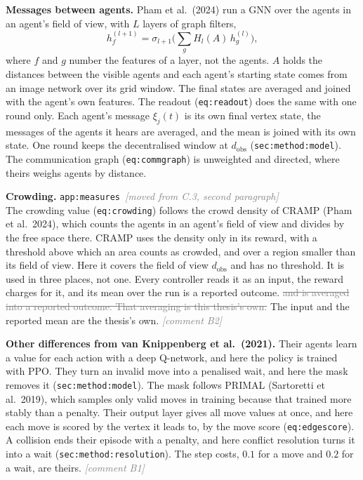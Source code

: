 \documentclass[11pt,a4paper]{article}
\newcommand{\new}[1]{\textcolor{newc}{#1}}
\newcommand{\old}[1]{\textcolor{gray}{\sout{#1}}}
\newcommand{\lref}[1]{{\small\texttt{#1}}}
\newcommand{\moved}[1]{{\small\textcolor{gray}{\emph{[moved from #1]}}}}
\newcommand{\cmt}[1]{{\small\textcolor{gray}{\emph{[comment #1]}}}}
\begin{document}
\textbf{Messages between agents.} Pham et al.\ (2024) run a GNN over the
agents in an agent's field of view, with $L$ layers of graph filters,
\begin{equation*}
  h^{(l+1)}_f = \sigma_{l+1}\bigl( \textstyle\sum_{g} H_l(A)\, h^{(l)}_g \bigr),
\end{equation*}
where $f$ and $g$ number the features of a layer, not the agents. $A$ holds
the distances between the visible agents and each agent's starting state
comes from an image network over its grid window. The final states are
averaged and joined with the agent's own features. The readout
(\lref{eq:readout}) does the same with one round only. Each agent's message
$\xi_j(t)$ is its own final vertex state, the messages of the agents it hears
are averaged, and the mean is joined with its own state. One round keeps the
decentralised window at $d_{\mathrm{obs}}$ (\lref{sec:method:model}). The
communication graph (\lref{eq:commgraph}) is unweighted and directed, where
theirs weighs agents by distance.

\textbf{Crowding.} \hfill\lref{app:measures}\ \moved{C.3, second paragraph}\\
The crowding value (\lref{eq:crowding}) follows the crowd density of CRAMP
(Pham et al.\ 2024), which counts the agents in an agent's field of view and
divides by the free space there. CRAMP uses the density only in its reward,
with a threshold above which an area counts as crowded, and over a region
smaller than its field of view. Here it covers the field of view
$d_{\mathrm{obs}}$ and has no threshold. \new{It is used in three places, not
one. Every controller reads it as an input, the reward charges for it, and
its mean over the run is a reported outcome.} \old{and is averaged into a
reported outcome. That averaging is this thesis's own.} \new{The input and the
reported mean are the thesis's own.} \hfill\cmt{B2}

\textbf{Other differences from van Knippenberg et al.\ (2021).} Their agents
learn a value for each action with a deep Q-network, and here the policy is
trained with PPO. They turn an invalid move into a penalised wait, and here
the mask removes it (\lref{sec:method:model}). \new{The mask follows PRIMAL
(Sartoretti et al.\ 2019), which samples only valid moves in training
because that trained more stably than a penalty.} Their output layer gives
all move values at once, and here each move is scored by the vertex it leads
to, by the move score (\lref{eq:edgescore}). A collision ends their episode
with a penalty, and here conflict resolution turns it into a wait
(\lref{sec:method:resolution}). The step costs, $0.1$ for a move and $0.2$
for a wait, are theirs. \hfill\cmt{B1}
\end{document}
